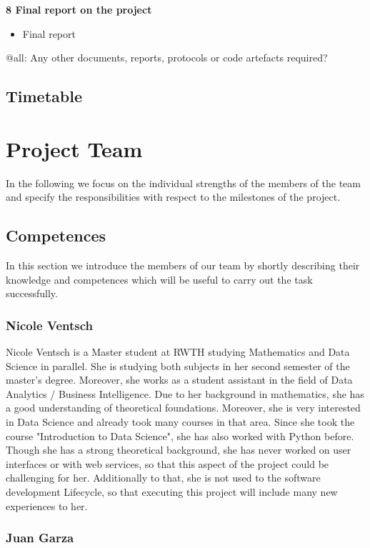 \documentclass[notitlepage]{article}
\begin{document}
\begin{flushleft}
\textbf{8 Final report on the project}
\\
\begin{itemize}
	\item Final report
\end{itemize}

{\color{red} @all: Any other documents, reports, protocols or code artefacts required?}

\subsection{Timetable}

\section{Project Team}
In the following we focus on the individual strengths of the members of the team and specify the responsibilities with respect to the milestones of the project.

\subsection{Competences} 
In this section we introduce the members of our team by shortly describing their knowledge and competences which will be useful to carry out the task successfully.

\subsubsection*{Nicole Ventsch}

Nicole Ventsch is a Master student at RWTH studying Mathematics and Data Science in parallel. She is studying both subjects in her second semester of the master's degree. Moreover, she works as a student assistant in the field of Data Analytics / Business Intelligence. Due to her background in mathematics, she has a good understanding of theoretical foundations. Moreover, she is very interested in Data Science and already took many courses in that area. Since she took the course "Introduction to Data Science", she has also worked with Python before. Though she has a strong theoretical background, she has never worked on user interfaces or with web services, so that this aspect of the project could be challenging for her. Additionally to that, she is not used to the software development Lifecycle, so that executing this project will include many new experiences to her. 

\subsubsection*{Juan Garza}


\end{flushleft}
\end{document}
